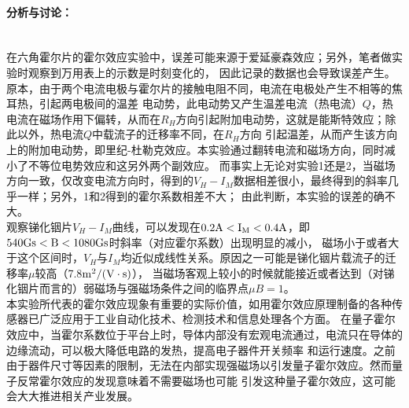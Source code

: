 \documentclass[UTF8]{ctexart}
\begin{document}
\paragraph*{分析与讨论：}~\\
\indent 在六角霍尔片的霍尔效应实验中，误差可能来源于爱延豪森效应；另外，笔者做实验时观察到万用表上的示数是时刻变化的，
因此记录的数据也会导致误差产生。~\\
\indent 原本，由于两个电流电极与霍尔片的接触电阻不同，电流在电极处产生不相等的焦耳热，引起两电极间的温差
电动势，此电动势又产生温差电流（热电流）$Q$，热电流在磁场作用下偏转，从而在$R_{H}$方向引起附加电动势，这就是能斯特效应；除此以外，热电流$Q$中载流子的迁移率不同，在$R_{H}$方向
引起温差，从而产生该方向上的附加电动势，即里纪-杜勒克效应。本实验通过翻转电流和磁场方向，同时减小了不等位电势效应和这另外两个副效应。
而事实上无论对实验1还是2，当磁场方向一致，仅改变电流方向时，得到的$V_{H}-I_{M}$数据相差很小，最终得到的斜率几乎一样；另外，1和2得到的霍尔系数相差不大；
由此判断，本实验的误差的确不大。~\\
\indent 观察锑化铟片$V_{H}-I_{M}$曲线，可以发现在$0.2\rm{A}<I_{M}<0.4\rm{A}$，即$540\rm{Gs}<B<1080\rm{Gs}$时斜率（对应霍尔系数）出现明显的减小，
磁场小于或者大于这个区间时，$V_{H}$与$I_{M}$均近似成线性关系。原因之一可能是锑化铟片载流子的迁移率$\mu$较高（7.8$\rm{m^{2}/(V\cdot s)}$），
当磁场客观上较小的时候就能接近或者达到（对锑化铟片而言的）弱磁场与强磁场条件之间的临界点$\mu B=1$。~\\
\indent 本实验所代表的霍尔效应现象有重要的实际价值，如用霍尔效应原理制备的各种传感器已广泛应用于工业自动化技术、检测技术和信息处理各个方面。
在量子霍尔效应中，当霍尔系数位于平台上时，导体内部没有宏观电流通过，电流只在导体的边缘流动，可以极大降低电路的发热，提高电子器件开关频率
和运行速度。之前由于器件尺寸等因素的限制，无法在内部实现强磁场以引发量子霍尔效应。然而量子反常霍尔效应的发现意味着不需要磁场也可能
引发这种量子霍尔效应，这可能会大大推进相关产业发展。

\clearpage 

\label{unknown}
\end{document}
